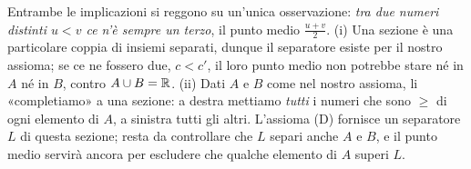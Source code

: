\begin{schema}
\end{schema}

\begin{strategia}
Entrambe le implicazioni si reggono su un'unica osservazione: \emph{tra due numeri
distinti $u<v$ ce n'è sempre un terzo}, il punto medio $\frac{u+v}{2}$. (i) Una sezione è
una particolare coppia di insiemi separati, dunque il separatore esiste per il nostro
assioma; se ce ne fossero due, $c<c'$, il loro punto medio non potrebbe stare né in $A$
né in $B$, contro $A\cup B=\mathbb{R}$. (ii) Dati $A$ e $B$ come nel nostro assioma, li
«completiamo» a una sezione: a destra mettiamo \emph{tutti} i numeri che sono $\ge$ di
ogni elemento di $A$, a sinistra tutti gli altri. L'assioma (D) fornisce un separatore
$L$ di questa sezione; resta da controllare che $L$ separi anche $A$ e $B$, e il punto
medio servirà ancora per escludere che qualche elemento di $A$ superi $L$.
\end{strategia}

